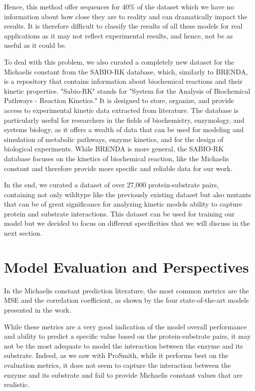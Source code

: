 Hence, this method offer sequences for 40\% of the dataset which we have no information about how close they are to reality and can dramatically impact the results. It is therefore difficult to classify the results of all these models for real applications as it may not reflect experimental results, and hence, not be as useful as it could be.

To deal with this problem, we also curated a completely new dataset for the Michaelis constant from the
SABIO-RK database, which, similarly to BRENDA, is a repository that contains information about biochemical reactions and their kinetic properties. "Sabio-RK" stands for "System for the Analysis of Biochemical Pathways - Reaction Kinetics." It is designed to store, organize, and provide access to experimental kinetic data extracted from literature. The database is particularly useful for researchers in the fields of biochemistry, enzymology, and systems biology, as it offers a wealth of data that can be used for modeling and simulation of metabolic pathways, enzyme kinetics, and for the design of biological experiments. While BRENDA is more general, the SABIO-RK database focuses on the kinetics of biochemical reaction, like the Michaelis constant and therefore provide more specific and reliable data for our work.

In the end, we curated a dataset of over 27,000 protein-substrate pairs, containing not only wildtype like the previously existing dataset but also mutants that can be of great significance for analyzing kinetic models ability to capture protein and substrate interactions. This dataset can be used for training our model but we decided to focus on different specificities that we will discuss in the next section.

\section{Model Evaluation and Perspectives}

In the Michaelis constant prediction literature, the most common metrics are the MSE and the correlation
coefficient, as shown by the four state-of-the-art models presented in the work. 

While these metrics are a very good indication of the model overall performance and ability to predict a specific value based on the protein-substrate pairs, it may not be the most adequate to model the interaction between the enzyme and its substrate. Indeed, as we saw with ProSmith, while it performs best on the evaluation metrics, it does not seem to capture the interaction between the enzyme and its substrate and fail to provide Michaelis constant values that are realistic.

